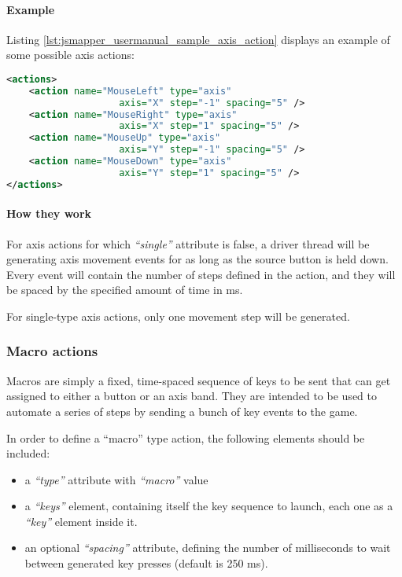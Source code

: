 \paragraph{Example}
Listing \ref{lst:jsmapper_usermanual_sample_axis_action} displays an example of some possible axis actions: 
\begin{lstlisting}[language=XML,caption={Sample axis actions},label={lst:jsmapper_usermanual_sample_axis_action}]
<actions>
	<action name="MouseLeft" type="axis" 
					axis="X" step="-1" spacing="5" />
	<action name="MouseRight" type="axis" 
					axis="X" step="1" spacing="5" />
	<action name="MouseUp" type="axis" 
					axis="Y" step="-1" spacing="5" />
	<action name="MouseDown" type="axis" 
					axis="Y" step="1" spacing="5" />
</actions>  
\end{lstlisting}

\paragraph{How they work}
For axis actions for which \emph{``single''} attribute is false, a driver thread will be generating axis movement events for as long as the source button is held down. Every event will contain the number of steps defined in the action, and they will be spaced by the specified amount of time in ms.

For single-type axis actions, only one movement step will be generated.


\subsubsection{Macro actions}
Macros are simply a fixed, time-spaced sequence of keys to be sent that can get assigned to either a button or an axis band. They are intended to be used to automate a series of steps by sending a bunch of key events to the game.

In order to define a ``macro'' type action, the following elements should be included:
\begin{itemize}
	\item a \emph{``type''} attribute with \emph{``macro''} value
	\item a \emph{``keys''} element, containing itself the key sequence to launch, each one as a \emph{``key''} element inside it.
	\item an optional \emph{``spacing''} attribute, defining the number of milliseconds to wait between generated key presses (default is 250 ms).
\end{itemize}

